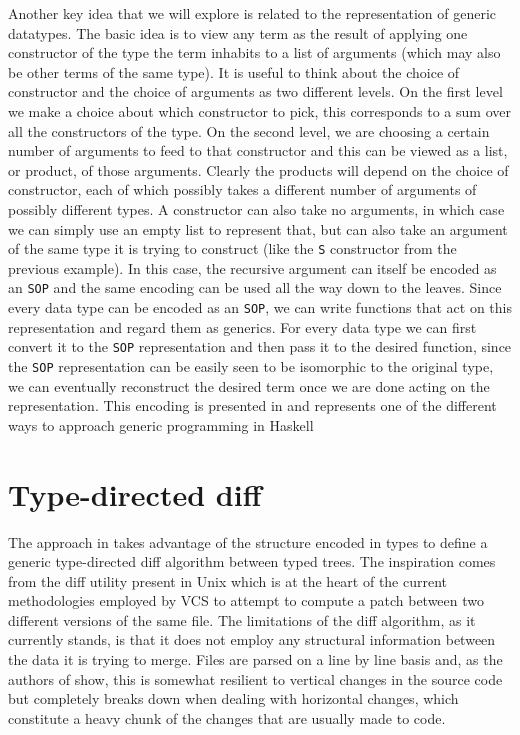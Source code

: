 \documentclass[11pt]{article}
\begin{document}
Another key idea that we will explore is related to the representation of 
generic datatypes. The basic idea is to view any term as the result of applying 
one constructor of the type the term inhabits to a list of arguments (which may also be other terms of the
same type). It is useful to think about the choice of constructor and the choice 
of arguments as two different levels. On the first level we 
make a choice about which constructor to pick, this corresponds to a sum
over all the constructors of the type. On the second level, we are choosing a certain number of arguments 
to feed to that constructor and this can be viewed as a list, or product, of 
those arguments. Clearly the products will depend on the choice of constructor, 
each of which possibly takes a different number of arguments of possibly 
different types. A constructor can also take no arguments, in which case we 
can simply use an empty list to represent that, but can also take an argument of 
the same type it is trying to construct (like the \texttt{S} constructor from the previous example). 
In this case, the recursive argument can itself be encoded as an \texttt{SOP} 
and the same encoding can be used all the way down to the leaves. 
Since every data type can be encoded as an \texttt{SOP}, we can write functions 
that act on this representation and regard them as generics. For every data type 
we can first convert it to the \texttt{SOP} representation and then pass it to 
the desired function, since the \texttt{SOP} representation can be easily 
seen to be isomorphic to the original type, we can eventually reconstruct the 
desired term once we are done acting on the representation. This encoding is 
presented in \cite{true-sop} and represents one of the different ways to 
approach generic programming in Haskell

\section{Type-directed diff}\label{type-directed-diff}

The approach in \cite{type-directed-diff} takes advantage of the structure 
encoded in types to define a generic type-directed diff algorithm between
typed trees. The inspiration comes from the diff utility present in
Unix which is at the heart of the current methodologies employed by VCS
to attempt to compute a patch between two different versions of the same
file. The limitations of the diff algorithm, as it currently stands, is
that it does not employ any structural information between the data it
is trying to merge. Files are parsed on a line by line basis and, as
the authors of \cite{type-directed-diff} show, this is somewhat resilient to vertical changes in the
source code but completely breaks down when dealing with horizontal
changes, which constitute a heavy chunk of the changes that are usually
made to code.
\end{document}
